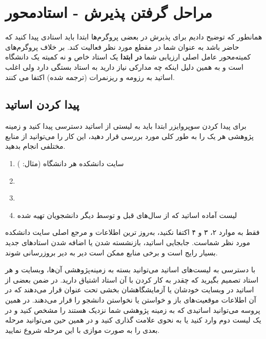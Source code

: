 \section{مراحل گرفتن پذیرش - استادمحور}
همانطور که توضیح دادیم برای پذیرش در بعضی پروگرم‌ها ابتدا باید استادی پیدا کنید که حاضر باشد به عنوان  شما در 
مقطع مورد نظر فعالیت کند. بر خلاف پروگرم‌های کمیته‌محور عامل اصلی ارزیابی شما \textbf{در ابتدا} یک استاد خاص و نه کمیته یک دانشگاه است 
و به همین دلیل اینکه چه مدارکی نیاز دارید به استاد بستگی دارد ولی اغلب اساتید به رزومه و ریزنمرات (ترجمه شده) اکتفا می کنند. 

\subsection{پیدا کردن اساتید}
برای پیدا کردن سوپروایزر ابتدا باید به لیستی از اساتید دسترسی پیدا کنید و زمینه پژوهشی هر یک را به طور کلی مورد بررسی قرار دهید، 
این کار را می‌توانید از منابع مختلفی انجام بدهید. 

\begin{enumerate}
  \item سایت دانشکده‌ هر دانشگاه (مثال:‌ \href{https://www.ualberta.ca/en/computing-science/faculty-and-staff/facultyold.html}{})
  \item \href{https://csrankings.com}{}
  \item \href{https://airankings.com}{}
  \item لیست آماده اساتید که از سال‌های قبل و توسط دیگر دانشجویان تهیه شده
\end{enumerate}

\begin{tipbox}
فقط به موارد ۲، ۳ و ۴ اکتفا نکنید، به‌روز ترین اطلاعات و مرجع اصلی سایت دانشکده مورد نظر شماست. جابجایی اساتید، بازنشسته شدن 
یا اضافه شدن استاد‌های جدید بسیار رایج است و برخی منابع ممکن است دیر به دیر بروزرسانی شوند.
\end{tipbox}

با دسترسی به لیست‌های اساتید می‌توانید بسته به زمینه‌پژوهشی آن‌ها، وبسایت و  هر استاد تصمیم بگیرید که چقدر 
به کار کردن با آن استاد اشتیاق دارید. در ضمن بعضی از اساتید در وبسایت خودشان یا آزمایشگاهشان بخشی تحت عنوان  
قرار می‌دهند که در آن اطلاعات موقعیت‌های باز و خواستن یا نخواستن دانشجو را قرار می‌دهند. در همین پروسه می‌توانید 
اساتیدی که به زمینه پژوهشی شما نزدیک هستند را مشخص کنید و در یک لیست دوم وارد کنید یا به نحوی علامت گذاری کنید و در همین حین می‌توانید مرحله بعدی
را به صورت موازی با این مرحله شروع نمایید.


